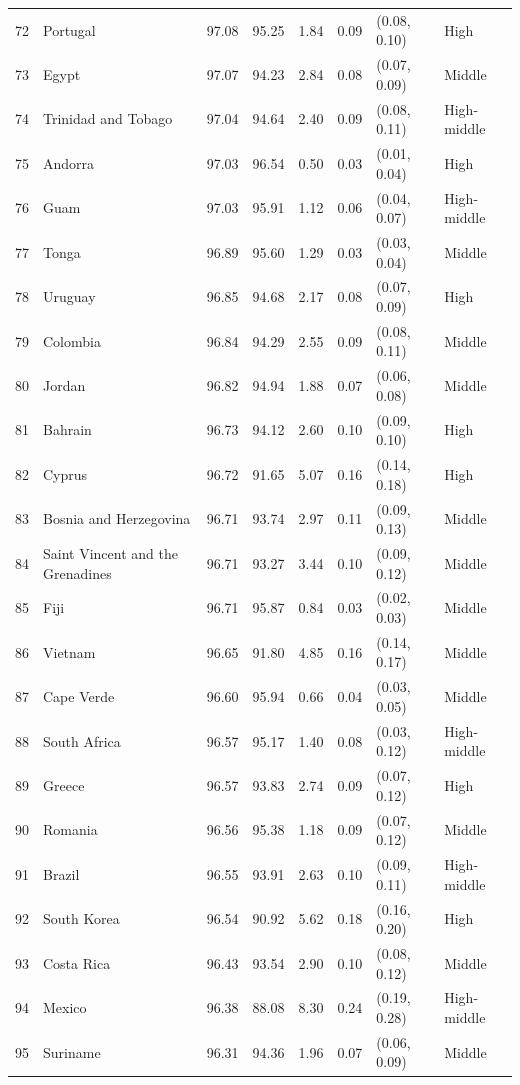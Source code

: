 \begin{longtable}{r l r r r r l l}
72 & Portugal & 97.08 & 95.25 & 1.84 & 0.09 & (0.08, 0.10) & High \\
73 & Egypt & 97.07 & 94.23 & 2.84 & 0.08 & (0.07, 0.09) & Middle \\
74 & Trinidad and Tobago & 97.04 & 94.64 & 2.40 & 0.09 & (0.08, 0.11) & High-middle \\
75 & Andorra & 97.03 & 96.54 & 0.50 & 0.03 & (0.01, 0.04) & High \\
76 & Guam & 97.03 & 95.91 & 1.12 & 0.06 & (0.04, 0.07) & High-middle \\
77 & Tonga & 96.89 & 95.60 & 1.29 & 0.03 & (0.03, 0.04) & Middle \\
78 & Uruguay & 96.85 & 94.68 & 2.17 & 0.08 & (0.07, 0.09) & High \\
79 & Colombia & 96.84 & 94.29 & 2.55 & 0.09 & (0.08, 0.11) & Middle \\
80 & Jordan & 96.82 & 94.94 & 1.88 & 0.07 & (0.06, 0.08) & Middle \\
81 & Bahrain & 96.73 & 94.12 & 2.60 & 0.10 & (0.09, 0.10) & High \\
82 & Cyprus & 96.72 & 91.65 & 5.07 & 0.16 & (0.14, 0.18) & High \\
83 & Bosnia and Herzegovina & 96.71 & 93.74 & 2.97 & 0.11 & (0.09, 0.13) & Middle \\
84 & Saint Vincent and the Grenadines & 96.71 & 93.27 & 3.44 & 0.10 & (0.09, 0.12) & Middle \\
85 & Fiji & 96.71 & 95.87 & 0.84 & 0.03 & (0.02, 0.03) & Middle \\
86 & Vietnam & 96.65 & 91.80 & 4.85 & 0.16 & (0.14, 0.17) & Middle \\
87 & Cape Verde & 96.60 & 95.94 & 0.66 & 0.04 & (0.03, 0.05) & Middle \\
88 & South Africa & 96.57 & 95.17 & 1.40 & 0.08 & (0.03, 0.12) & High-middle \\
89 & Greece & 96.57 & 93.83 & 2.74 & 0.09 & (0.07, 0.12) & High \\
90 & Romania & 96.56 & 95.38 & 1.18 & 0.09 & (0.07, 0.12) & Middle \\
91 & Brazil & 96.55 & 93.91 & 2.63 & 0.10 & (0.09, 0.11) & High-middle \\
92 & South Korea & 96.54 & 90.92 & 5.62 & 0.18 & (0.16, 0.20) & High \\
93 & Costa Rica & 96.43 & 93.54 & 2.90 & 0.10 & (0.08, 0.12) & Middle \\
94 & Mexico & 96.38 & 88.08 & 8.30 & 0.24 & (0.19, 0.28) & High-middle \\
95 & Suriname & 96.31 & 94.36 & 1.96 & 0.07 & (0.06, 0.09) & Middle \\

\end{longtable}
